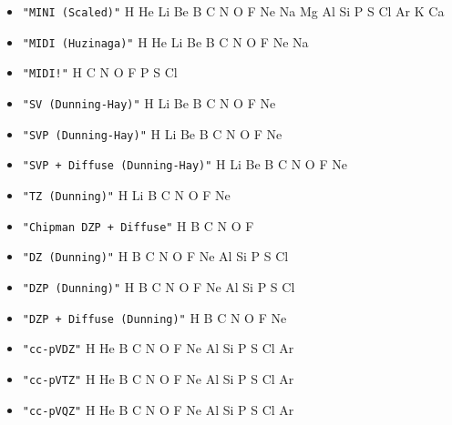 \begin{itemize}
\item \verb#"MINI (Scaled)"# \newline
 H He Li Be B C N O F Ne Na Mg Al Si P S Cl Ar K Ca

\item \verb#"MIDI (Huzinaga)"# \newline
 H He Li Be B C N O F Ne Na

\item \verb#"MIDI!"# \newline
 H C N O F P S Cl

\item \verb#"SV (Dunning-Hay)"# \newline
 H Li Be B C N O F Ne

\item \verb#"SVP (Dunning-Hay)"# \newline
 H Li Be B C N O F Ne

\item \verb#"SVP + Diffuse (Dunning-Hay)"# \newline
 H Li Be B C N O F Ne

\item \verb#"TZ (Dunning)"# \newline
 H Li B C N O F Ne

\item \verb#"Chipman DZP + Diffuse"# \newline
 H B C N O F

\item \verb#"DZ (Dunning)"# \newline
 H B C N O F Ne Al Si P S Cl

\item \verb#"DZP (Dunning)"# \newline
 H B C N O F Ne Al Si P S Cl

\item \verb#"DZP + Diffuse (Dunning)"# \newline
 H B C N O F Ne

\item \verb#"cc-pVDZ"# \newline
 H He B C N O F Ne Al Si P S Cl Ar

\item \verb#"cc-pVTZ"# \newline
 H He B C N O F Ne Al Si P S Cl Ar

\item \verb#"cc-pVQZ"# \newline
 H He B C N O F Ne Al Si P S Cl Ar


\end{itemize}
